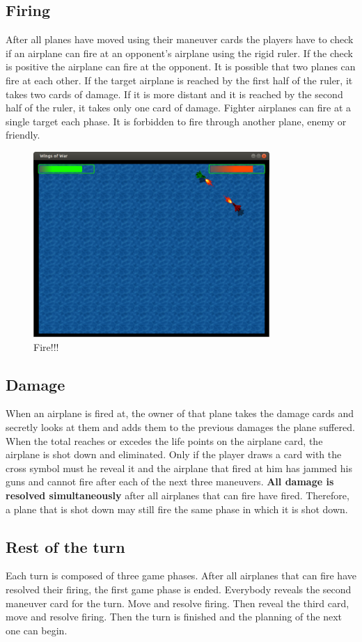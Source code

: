 \subsection{Firing}
After all planes have moved using their maneuver cards the players have to check if an airplane can fire at an opponent’s airplane using the rigid ruler. If the check is positive the airplane can fire at the opponent. It is possible that two planes can fire at each other. 
If the target airplane is reached by the first half of the ruler, it takes two cards of damage. If it is more distant and it is reached by the second half of the ruler, it takes only one card of damage. Fighter airplanes can fire at a single target each phase. It is forbidden to fire through another plane, enemy or friendly.
\begin{figure}
  \centering
      \includegraphics[width=0.8\textwidth]{images/4.png}
  \caption{Fire!!!}
\end{figure}
\subsection{Damage}
When an airplane is fired at, the owner of that plane takes the damage cards and secretly looks at them and adds them to the previous damages the plane suffered. When the total reaches or excedes the life points on the airplane card, the airplane is shot down and eliminated.
Only if the player draws a card with the cross symbol must he reveal it and the airplane that fired at him has jammed his guns and cannot fire after each of the next three maneuvers.
\textbf{All damage is resolved simultaneously} after all airplanes that can fire have fired. Therefore, a plane that is shot down may still fire the same phase in which it is shot down.
\subsection{Rest of the turn}
Each turn is composed of three game phases. After all airplanes that can fire have resolved their firing, the first game phase is ended. Everybody reveals the second maneuver card for the  turn. Move and resolve firing. Then reveal the third card, move  and resolve firing. Then the turn is finished and the planning  of the next one can begin.
